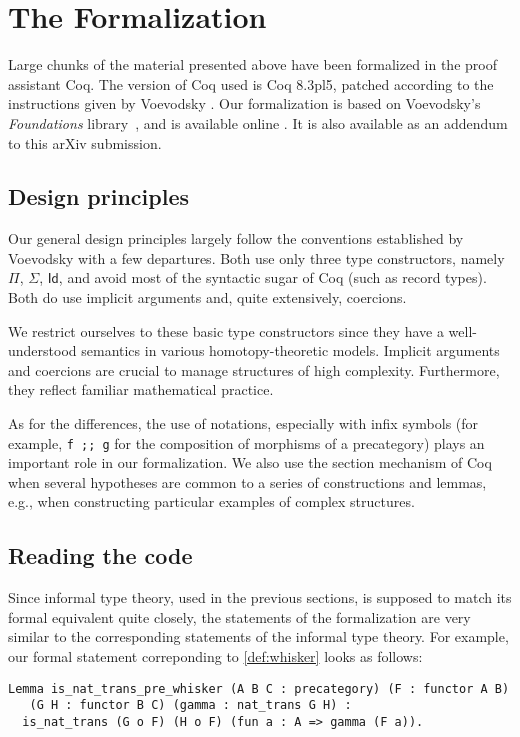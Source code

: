 
\section{The Formalization}
\label{sec:formalization}


Large chunks of the material presented above have been formalized in the proof assistant \textsf{Coq}.
The version of \textsf{Coq} used is \textsf{Coq} 8.3pl5, patched according to the instructions given by
Voevodsky \cite{vv_foundations}.
Our formalization is based on Voevodsky's \emph{Foundations} library~\cite{vv_foundations},
and is available online \cite{rezk_coq}. 
It is also available as an addendum to this arXiv submission.


\subsection*{Design principles}
Our general design principles largely follow the conventions established by Voevodsky \cite{vv_foundations} 
with a few departures. 
Both use only three type constructors, namely $\Pi$, $\Sigma$, $\textsf{Id}$, and avoid most of the syntactic sugar of \textsf{Coq} (such as record types).
Both do use implicit arguments and, quite extensively, coercions.

We restrict ourselves to these basic type constructors since they have a well-understood
semantics in various homotopy-theoretic models. Implicit arguments and coercions are 
crucial to manage structures of high complexity. Furthermore, they reflect
 familiar mathematical practice.


As for the differences, the use of notations, especially with infix symbols (for example, \lstinline!f ;; g! for 
the composition of morphisms of a precategory) plays an important role in our formalization. 
We also use the section mechanism of \textsf{Coq} 
when several hypotheses are common to a series of constructions and lemmas, e.g., 
when constructing particular examples of complex structures.

\subsection*{Reading the code}

Since informal type theory, used in the previous sections, is supposed to match its formal equivalent quite closely, 
the statements of the formalization are very similar to the corresponding statements of the informal type theory. 
For example, our formal statement correponding to \autoref{def:whisker} looks as follows:
\begin{lstlisting}
Lemma is_nat_trans_pre_whisker (A B C : precategory) (F : functor A B)
   (G H : functor B C) (gamma : nat_trans G H) :
  is_nat_trans (G o F) (H o F) (fun a : A => gamma (F a)).
\end{lstlisting}


